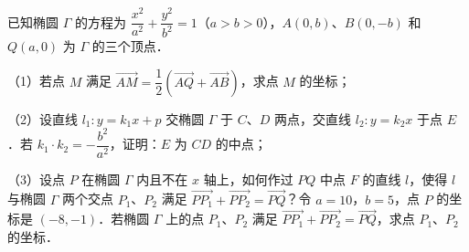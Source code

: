 \begin{question}
已知椭圆 $\Gamma$ 的方程为 $\dfrac{x^2}{a^2}+\dfrac{y^2}{b^2}=1$（$a>b>0$），$A(0,b)$、$B(0,-b)$ 和 $Q(a,0)$ 为 $\Gamma$ 的三个顶点．

（1）若点 $M$ 满足 $\overrightarrow{AM}=\dfrac12\left(\overrightarrow{AQ}+\overrightarrow{AB}\right)$，求点 $M$ 的坐标；

（2）设直线 $l_1:y=k_1x+p$ 交椭圆 $\Gamma$ 于 $C$、$D$ 两点，交直线 $l_2:y=k_2x$ 于点 $E$．若 $k_1\cdot k_2=-\dfrac{b^2}{a^2}$，证明：$E$ 为 $CD$ 的中点；

（3）设点 $P$ 在椭圆 $\Gamma$ 内且不在 $x$ 轴上，如何作过 $PQ$ 中点 $F$ 的直线 $l$，使得 $l$ 与椭圆 $\Gamma$ 两个交点 $P_1$、$P_2$ 满足 $\overrightarrow{PP_1}+\overrightarrow{PP_2}=\overrightarrow{PQ}$？令 $a=10$，$b=5$，点 $P$ 的坐标是 $(-8,-1)$．若椭圆 $\Gamma$ 上的点 $P_1$、$P_2$ 满足 $\overrightarrow{PP_1}+\overrightarrow{PP_2}=\overrightarrow{PQ}$，求点 $P_1$、$P_2$ 的坐标．

\end{question}